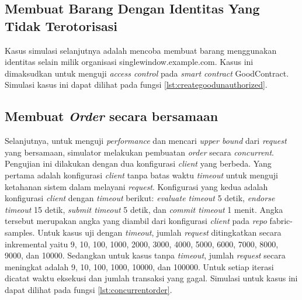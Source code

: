 

\subsection{Membuat Barang Dengan Identitas Yang Tidak Terotorisasi}
Kasus simulasi selanjutnya adalah mencoba membuat barang menggunakan identitas selain milik organisasi singlewindow.example.com. Kasus ini dimaksudkan untuk menguji \textit{access control} pada \textit{smart contract} GoodContract. Simulasi kasus ini dapat dilihat pada fungsi \ref{lst:creategoodunauthorized}.



\subsection{Membuat \textit{Order} secara bersamaan}
Selanjutnya, untuk menguji \textit{performance} dan mencari \textit{upper bound} dari \textit{request} yang bersamaan, simulator melakukan pembuatan \textit{order} secara \textit{concurrent}. Pengujian ini dilakukan dengan dua konfigurasi \textit{client} yang berbeda. Yang pertama adalah konfigurasi \textit{client} tanpa batas waktu \textit{timeout} untuk menguji ketahanan sistem dalam melayani \textit{request}. Konfigurasi yang kedua adalah konfigurasi \textit{client} dengan \textit{timeout} berikut: \textit{evaluate timeout} 5 detik, \textit{endorse timeout} 15 detik, \textit{submit timeout} 5 detik, dan \textit{commit timeout} 1 menit. Angka tersebut merupakan angka yang diambil dari konfigurasi \textit{client} pada \textit{repo} fabric-samples. Untuk kasus uji dengan \textit{timeout}, jumlah \textit{request} ditingkatkan secara inkremental yaitu 9, 10, 100, 1000, 2000, 3000, 4000, 5000, 6000, 7000, 8000, 9000, dan 10000. Sedangkan untuk kasus tanpa \textit{timeout}, jumlah \textit{request} secara meningkat adalah 9, 10, 100, 1000, 10000, dan 100000. Untuk setiap iterasi dicatat waktu eksekusi dan jumlah transaksi yang gagal. Simulasi untuk kasus ini dapat dilihat pada fungsi \ref{lst:concurrentorder}.








